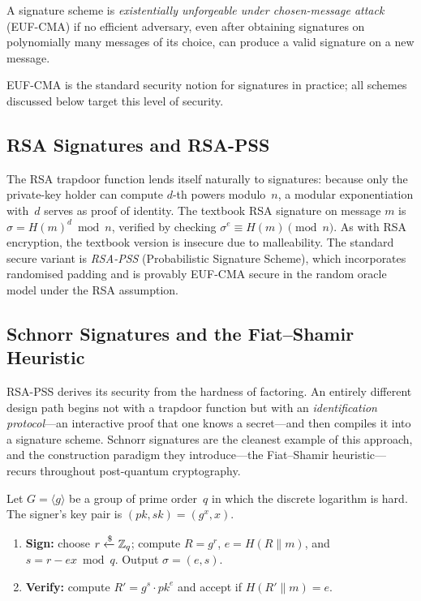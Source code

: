 \begin{definition}
\label{def:euf-cma}
A signature scheme is \emph{existentially unforgeable under chosen-message attack} (EUF-CMA) if no efficient adversary, even after obtaining signatures on polynomially many messages of its choice, can produce a valid signature on a new message.
\end{definition}

EUF-CMA is the standard security notion for signatures in practice; all schemes discussed below target this level of security.

\subsection{RSA Signatures and RSA-PSS}
\label{subsec:rsa-sig}

The RSA trapdoor function lends itself naturally to signatures: because only the private-key holder can compute $d$-th powers modulo~$n$, a modular exponentiation with~$d$ serves as proof of identity.  The textbook RSA signature on message $m$ is $\sigma = H(m)^d \bmod n$, verified by checking $\sigma^e \equiv H(m) \pmod{n}$.  As with RSA encryption, the textbook version is insecure due to malleability.  The standard secure variant is \emph{RSA-PSS} (Probabilistic Signature Scheme), which incorporates randomised padding and is provably EUF-CMA secure in the random oracle model under the RSA assumption.

\subsection{Schnorr Signatures and the Fiat--Shamir Heuristic}
\label{subsec:schnorr}

RSA-PSS derives its security from the hardness of factoring.  An entirely different design path begins not with a trapdoor function but with an \emph{identification protocol}---an interactive proof that one knows a secret---and then compiles it into a signature scheme.  Schnorr signatures are the cleanest example of this approach, and the construction paradigm they introduce---the Fiat--Shamir heuristic---recurs throughout post-quantum cryptography.

\begin{definition}
\label{def:schnorr}
Let $G = \langle g \rangle$ be a group of prime order~$q$ in which the discrete logarithm is hard.  The signer's key pair is $(pk, sk) = (g^x, x)$.
\begin{enumerate}
\item \textbf{Sign:} choose $r \getsr \Z_q$; compute $R = g^r$, $e = H(R \| m)$, and $s = r - ex \bmod q$.  Output $\sigma = (e, s)$.
\item \textbf{Verify:} compute $R' = g^s \cdot pk^e$ and accept if $H(R' \| m) = e$.
\end{enumerate}
\end{definition}

